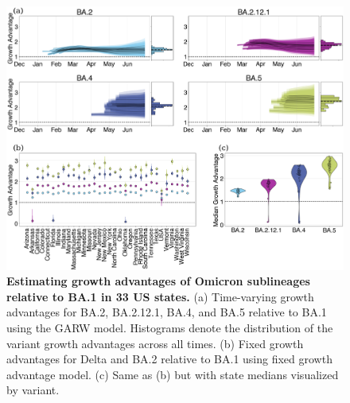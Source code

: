 \documentclass[11pt,oneside,letterpaper]{article}
\def\tbc#1{\textcolor{purple}{[#1]}}
\def\mfc#1{\textcolor{brown}{[#1]}}
\begin{document}
\begin{figure}[h!]
  \centering
  \includegraphics[width=\linewidth]{figs/omicron_growth_advantage.png}
  \caption{\textbf{Estimating growth advantages of Omicron sublineages relative to BA.1 in 33 US states.}
    (a) Time-varying growth advantages for BA.2, BA.2.12.1, BA.4, and BA.5 relative to BA.1 using the GARW model. 
    Histograms denote the distribution of the variant growth advantages across all times.
    (b) Fixed growth advantages for Delta and BA.2 relative to BA.1 using fixed growth advantage model.
    (c) Same as (b) but with state medians visualized by variant.
  }
  \label{fig:omicron_growth_advantages}
\end{figure}
\end{document}
